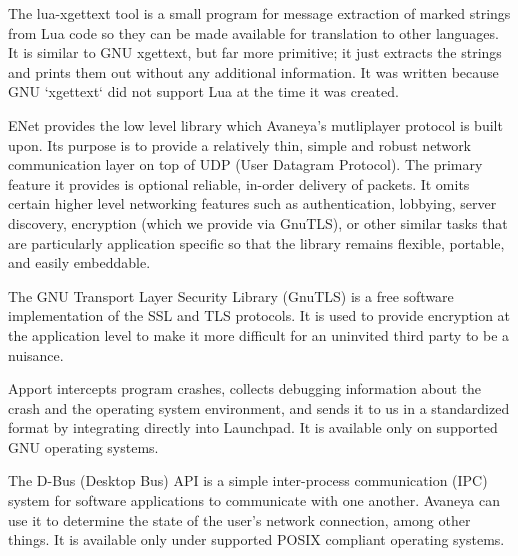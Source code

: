 The lua-xgettext tool is a small program for message extraction of marked strings from Lua code so they can be made available for translation to other languages. It is similar to GNU xgettext, but far more primitive; it just extracts the strings and prints them out without any additional information. It was written because GNU `xgettext` did not support Lua at the time it was created.
\stopitemize


\startitemize[4]
\setupwhitespace[big]

ENet provides the low level library which Avaneya's mutliplayer protocol is built upon. Its purpose is to provide a relatively thin, simple and robust network communication layer on top of UDP (User Datagram Protocol). The primary feature it provides is optional reliable, in-order delivery of packets. It omits certain higher level networking features such as authentication, lobbying, server discovery, encryption (which we provide via GnuTLS), or other similar tasks that are particularly application specific so that the library remains flexible, portable, and easily embeddable.


The GNU Transport Layer Security Library (GnuTLS) is a free software implementation of the SSL and TLS protocols. It is used to provide encryption at the application level to make it more difficult for an uninvited third party to be a nuisance.
\stopitemize


\startitemize[4]
\setupwhitespace[big]

Apport intercepts program crashes, collects debugging information about the crash and the operating system environment, and sends it to us in a standardized format by integrating directly into Launchpad. It is available only on supported GNU operating systems.


The D-Bus (Desktop Bus) API is a simple inter-process communication (IPC) system for software applications to communicate with one another. Avaneya can use it to determine the state of the user's network connection, among other things. It is available only under supported POSIX compliant operating systems.
\stopitemize


